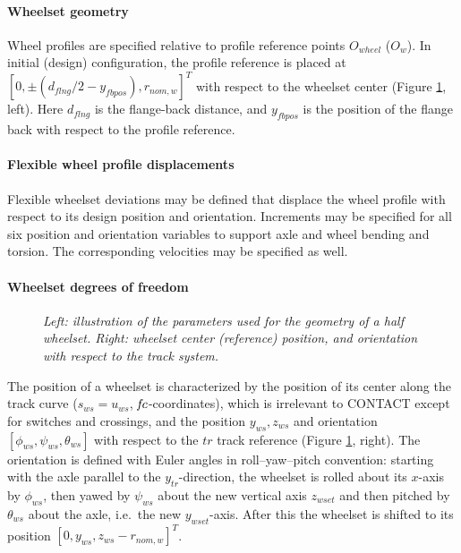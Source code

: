 \documentclass[12pt]{report}
\begin{document}
\paragraph{Wheelset geometry}

Wheel profiles are specified relative to profile reference points
$O_{wheel}$ ($O_w$). In initial (design) configuration, the profile
reference is placed at $[0, \pm (d_{flng}/2-y_{fbpos}), r_{nom,w}]^T$ with
respect to the wheelset center (Figure \ref{fig:wheel_coord}, left). Here
$d_{flng}$ is the flange-back distance, and $y_{fbpos}$ is the position of
the flange back with respect to the profile reference. 


\paragraph{Flexible wheel profile displacements}

Flexible wheelset deviations may be defined that displace the wheel
profile with respect to its design position and orientation.
Increments may be specified for all six position and orientation variables
to support axle and wheel bending and torsion. The corresponding velocities
may be specified as well.

\paragraph{Wheelset degrees of freedom}

\begin{figure}[bt]
\centering
{}
\hspace{10mm}
\caption{\em Left: illustration of the parameters used for the geometry of
        a half wheelset. Right: wheelset center (reference) position,
        and orientation with respect to the track system.}
\label{fig:wheel_coord}
\end{figure}

The position of a wheelset is characterized by the position of its center
along the track curve ($s_{ws}=u_{ws}$, $\mkern-2muf\mkern-2muc$-coordinates), which is
irrelevant to CONTACT except for switches and crossings, and the position
$y_{ws}, z_{ws}$ and orientation $[\phi_{ws}, \psi_{ws}, \theta_{ws}]$ with
respect to the $tr$ track reference (Figure \ref{fig:wheel_coord}, right).
The orientation is defined with Euler angles in roll--yaw--pitch convention:
starting with the axle parallel to the $y_{tr}$-direction, the wheelset is
rolled about its $x$-axis by $\phi_{ws}$, then yawed by $\psi_{ws}$ about
the new vertical axis $z_{wset}$ and then pitched by $\theta_{ws}$ about
the axle, i.e.\ the new $y_{wset}$-axis. After this the wheelset is shifted
to its position $[0,y_{ws},z_{ws}-r_{nom,w}]^T$.
\end{document}
